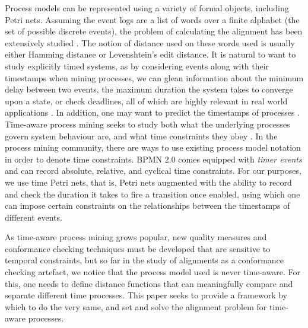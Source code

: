 \documentclass[conference]{IEEEtran}
\begin{document}

Process models can be represented using a variety of formal objects, including Petri nets. 
Assuming the event logs are a list of words over a finite alphabet (the set of possible discrete events), the problem of calculating the alignment has been extensively studied \cite{Adriansyah2014AligningOA} \cite{BCC21}. 
The notion of distance used on these words used is usually either Hamming distance or Levenshtein's edit distance. 
It is natural to want to study explicitly timed systems,
as by considering events along with their timestamps when mining processes, we can glean information about the minimum delay between two events, the maximum duration the system takes to converge upon a state, or check deadlines, all of which are highly relevant in real world applications \cite{Cheikhrouhou2014TheTP} \cite{Eder1999TimeCI} \cite{DBLP:conf/icpm/NguyenCWSME20}. 
In addition, one may want to predict the timestamps of processes \cite{SSA11}. 
Time-aware process mining seeks to study both what the underlying processes govern system behaviour are, and what time constraints they obey \cite{RMAW13} \cite{CRHA20}  \cite{AS21}. 
In the process mining community, there are ways to use existing process model notation in order to denote time constraints. BPMN 2.0 comes equipped with \emph{timer events} and can record absolute, relative, and cyclical time constraints. 
For our purposes, we use time Petri nets, that is, Petri nets augmented with the ability to record and check the duration it takes to fire a transition once enabled, using which one can impose certain constraints on the relationships between the timestamps of different events. 

As time-aware process mining grows popular, new quality measures and conformance checking techniques must be developed that are sensitive to temporal constraints, but so far in the study of alignments as a conformance checking artefact, we notice that the process model used is never time-aware. 
For this, one needs to define distance functions that can meaningfully compare and separate different time processes. 
This paper seeks to provide a framework by which to do the very same, and set and solve the alignment problem for time-aware processes.
\end{document}
